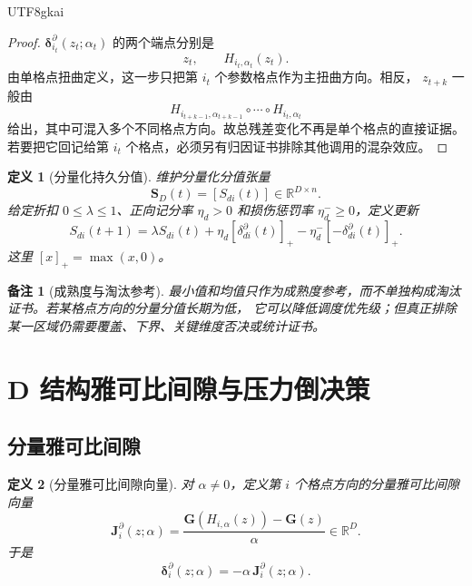 \documentclass[12pt]{article}
\newtheorem{definition}{定义}[section]
\newtheorem{remark}{备注}[section]
\newcommand{\RR}{\mathbb{R}}
\begin{document}
\begin{CJK*}{UTF8}{gkai}
\begin{proof}
\(\boldsymbol\delta_{i_t}^\partial(z_t;\alpha_t)\) 的两个端点分别是
\[
  z_t,
  \qquad
  H_{i_t,\alpha_t}(z_t).
\]
由单格点扭曲定义，这一步只把第 \(i_t\) 个参数格点作为主扭曲方向。相反，
\(z_{t+k}\) 一般由
\[
  H_{i_{t+k-1},\alpha_{t+k-1}}\circ\cdots\circ H_{i_t,\alpha_t}
\]
给出，其中可混入多个不同格点方向。故总残差变化不再是单个格点的直接证据。
若要把它回记给第 \(i_t\) 个格点，必须另有归因证书排除其他调用的混杂效应。
\end{proof}

\begin{definition}[分量化持久分值]
\label{def:lhts-score-tensor}
维护分量化分值张量
\[
  \mathbf S_D(t)=[S_{di}(t)]\in\RR^{D\times n}.
\]
给定折扣 \(0\le\lambda\le1\)、正向记分率 \(\eta_d>0\) 和损伤惩罚率
\(\eta_d^{-}\ge0\)，定义更新
\[
  S_{di}(t+1)
  =
  \lambda S_{di}(t)
  +
  \eta_d[\delta_{di}^{\partial}(t)]_+
  -
  \eta_d^{-}[-\delta_{di}^{\partial}(t)]_+ .
\]
这里 \([x]_+=\max(x,0)\)。
\end{definition}

\begin{remark}[成熟度与淘汰参考]
最小值和均值只作为成熟度参考，而不单独构成淘汰证书。若某格点方向的分量分值长期为低，
它可以降低调度优先级；但真正排除某一区域仍需要覆盖、下界、关键维度否决或统计证书。
\end{remark}

\section{D 结构雅可比间隙与压力倒决策}
\label{sec:lhts-d-structure}

\subsection{分量雅可比间隙}
\label{subsec:lhts-component-jacobian}

\begin{definition}[分量雅可比间隙向量]
\label{def:lhts-component-jacobian}
对 \(\alpha\ne0\)，定义第 \(i\) 个格点方向的分量雅可比间隙向量
\[
  \boxed{
  \mathbf J_i^\partial(z;\alpha)
  =
  \frac{\mathbf G(H_{i,\alpha}(z))-\mathbf G(z)}{\alpha}
  \in\RR^D
  } .
\]
于是
\[
  \boldsymbol\delta_i^\partial(z;\alpha)
  =
  -\alpha\,\mathbf J_i^\partial(z;\alpha).
\]
\end{definition}


\end{CJK*}
\end{document}
